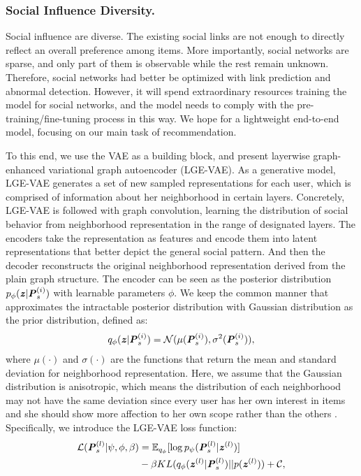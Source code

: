 \documentclass[letterpaper]{article} %
\begin{document}
\subsubsection{Social Influence Diversity.}
Social influence are diverse. The existing social links are not enough to directly reflect an overall preference among items. More importantly, social networks are sparse, and only part of them is observable while the rest remain unknown. Therefore, social networks had better be optimized with link prediction and abnormal detection. However, it will spend extraordinary resources training the model for social networks, and the model needs to comply with the pre-training/fine-tuning process in this way. We hope for a lightweight end-to-end model, focusing on our main task of recommendation. 

To this end, we use the VAE \cite{VAE} as a building block, and present layerwise graph-enhanced variational graph autoencoder (LGE-VAE). As a generative model, LGE-VAE generates a set of new sampled representations for each user, which is comprised of information about her neighborhood in certain layers. Concretely, LGE-VAE is followed with graph convolution, learning the distribution of social behavior from neighborhood representation in the range of designated layers. The encoders take the representation as features and encode them into latent representations that better depict the general social pattern. And then the decoder reconstructs the original neighborhood representation derived from the plain graph structure. The encoder can be seen as the posterior distribution $p_{\phi}(\textbf{\textit{z}}|\textbf{\textit{P}}_s^{(i)})$ with learnable parameters $\phi$. We keep the common manner that approximates the intractable posterior distribution with Gaussian distribution as the prior distribution, defined as:
\begin{align}
    q_{\phi}(\textbf{\textit{z}}|\textbf{\textit{P}}_s^{(i)}) = \mathcal{N}(\mu(\textbf{\textit{P}}_s^{(i)}), \sigma^2(\textbf{\textit{P}}_s^{(i)})),
\end{align}
where $\mu(\cdot)$ and $\sigma(\cdot)$ are the functions that return the mean and standard deviation for neighborhood representation. Here, we assume that the Gaussian distribution is anisotropic, which means the distribution of each neighborhood may not have the same deviation since every user has her own interest in items and she should show more affection to her own scope rather than the others \cite{ESRF}. Specifically, we introduce the LGE-VAE loss function:
\begin{equation}
    \begin{split}
        \mathcal{L}(\textbf{\textit{P}}_s^{(l)}|\psi,\phi,\beta)&=
        \mathbb{E}_{q_\phi}[\log p_{\psi}(\textbf{\textit{P}}_s^{(l)}|\textbf{\textit{z}}^{(l)})]\\
        &-\beta KL (q_{\phi}(\textbf{\textit{z}}^{(l)} | \textbf{\textit{P}}_s^{(l)}) || p(\textbf{\textit{z}}^{(l)})) + \mathcal{C},
    \end{split}
\end{equation}
\end{document}
